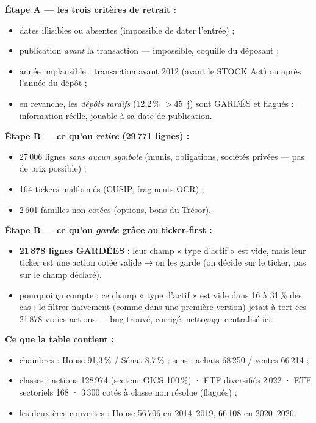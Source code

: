 \documentclass[10pt,a4paper]{article}
\begin{document}
\textbf{Étape A --- les trois critères de retrait :}
\begin{itemize}
\item dates illisibles ou absentes (impossible de dater l'entrée) ;
\item publication \emph{avant} la transaction --- impossible, coquille du déposant ;
\item année implausible : transaction avant 2012 (avant le STOCK Act) ou après l'année du dépôt ;
\item en revanche, les \emph{dépôts tardifs} (12{,}2\,\% $>45$~j) sont GARDÉS et flagués : information
      réelle, jouable à sa date de publication.
\end{itemize}

\textbf{Étape B --- ce qu'on \emph{retire} (29\,771 lignes) :}
\begin{itemize}
\item 27\,006 lignes \emph{sans aucun symbole} (munis, obligations, sociétés privées --- pas de prix possible) ;
\item 164 tickers malformés (CUSIP, fragments OCR) ;
\item 2\,601 familles non cotées (options, bons du Trésor).
\end{itemize}

\textbf{Étape B --- ce qu'on \emph{garde} grâce au ticker-first :}
\begin{itemize}
\item \textbf{21\,878 lignes GARDÉES} : leur champ « type d'actif » est vide, mais leur ticker est une
      action cotée valide → on les garde (on décide sur le ticker, pas sur le champ déclaré).
\item pourquoi ça compte : ce champ « type d'actif » est vide dans 16 à 31\,\% des cas ; le filtrer
      naïvement (comme dans une première version) jetait à tort ces 21\,878 vraies actions --- bug
      trouvé, corrigé, nettoyage centralisé ici.
\end{itemize}

\textbf{Ce que la table contient :}
\begin{itemize}
\item chambres : House 91{,}3\,\% / Sénat 8{,}7\,\% ; sens : achats 68\,250 / ventes 66\,214 ;
\item classes : actions 128\,974 (secteur GICS 100\,\%) · ETF diversifiés 2\,022 · ETF sectoriels 168 ·
      3\,300 cotés à classe non résolue (flagués) ;
\item les deux ères couvertes : House 56\,706 en 2014--2019, 66\,108 en 2020--2026.
\end{itemize}
\end{document}
